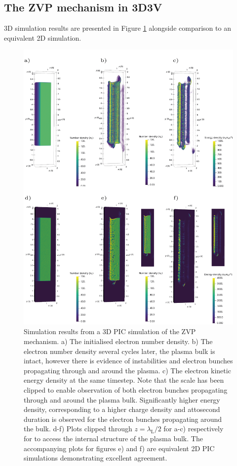 \subsection{The ZVP mechanism in 3D3V}\label{sec:zvp-3Dsimulations}
3D simulation results are presented in Figure \ref{fig:zvp3d} alongside comparison to an equivalent 2D simulation.
\begin{figure}
	\centering
	\includegraphics[width=0.9\linewidth]{figures/zvp/zvp_3D}
	\caption[The numerical simulation using a 3D \ac{PIC} code of the \ac{ZVP} mechanism.]{Simulation results from a 3D \ac{PIC} simulation of the \ac{ZVP} mechanism. a) The initialised electron number density. b) The electron number density several cycles later, the plasma bulk is intact, however there is evidence of instabilities and electron bunches propagating through and around the plasma. c) The electron kinetic energy density at the same timestep. Note that the scale has been clipped to enable observation of both electron bunches propagating through and around the plasma bulk. Significantly higher energy density, corresponding to a higher charge density and attosecond duration is observed for the electron bunches propagating around the bulk. d-f) Plots clipped through $z=\lambda_\mathrm{L}/2$ for a-c) respectively for to access the internal structure of the plasma bulk. The accompanying plots for figures e) and f) are equivalent 2D PIC simulations demonstrating excellent agreement.}
	\label{fig:zvp3d}
\end{figure}
